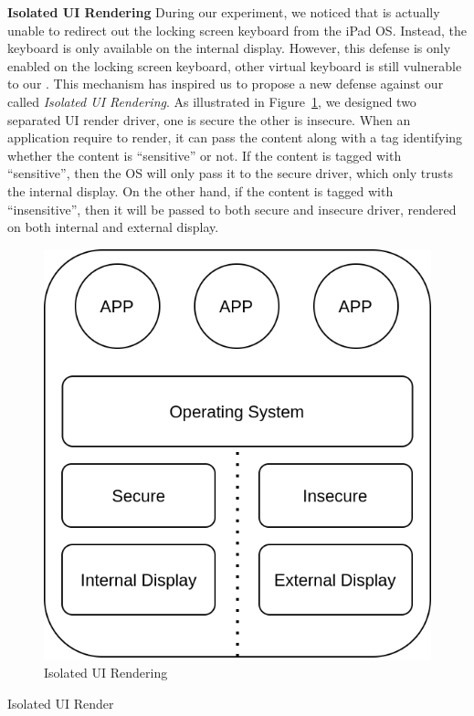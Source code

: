\textbf{Isolated UI Rendering}
During our experiment, we noticed that \tool is actually unable to redirect out the locking screen keyboard from the iPad OS. Instead, the keyboard is only available on the internal display. However, this defense is only enabled on the locking screen keyboard, other virtual keyboard is still vulnerable to our \tool. This mechanism has inspired us to propose a new defense against our \tool called \emph{Isolated UI Rendering}. As illustrated in Figure~\ref{fig:isolated_ui}, we designed two separated UI render driver, one is secure the other is insecure. When an application require to render, it can pass the content along with a tag identifying whether the content is ``sensitive'' or not. If the content is tagged with ``sensitive'', then the OS will only pass it to the secure driver, which only trusts the internal display. On the other hand, if the content is tagged with ``insensitive'', then it will be passed to both secure and insecure driver, rendered on both internal and external display.
\begin{figure}[htbp]
	\centering
	\includegraphics[width=\linewidth]{./Figs/isolated_ui.png}
	\caption{Isolated UI Rendering}
	\label{fig:isolated_ui}
\end{figure}

\begin{algorithm}[H]
	\SetAlgoLined
	\caption{Isolated UI Render}
\end{algorithm}

